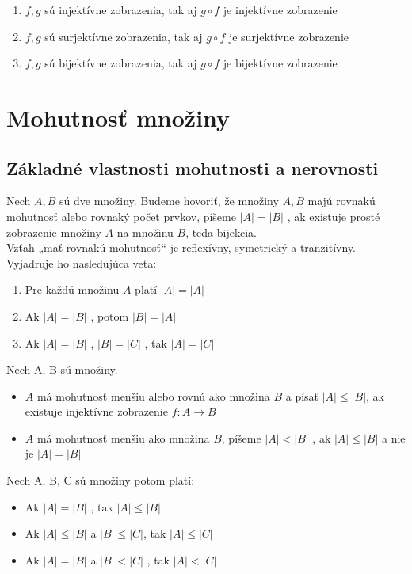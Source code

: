 		\begin{enumerate}
		\item $f , g$ sú injektívne zobrazenia, tak aj $g \circ f$ je injektívne zobrazenie
		\item $f , g$ sú surjektívne zobrazenia, tak aj $g \circ f$ je surjektívne zobrazenie
		\item $f , g$ sú bijektívne zobrazenia, tak aj $g \circ f$ je bijektívne zobrazenie
		\end{enumerate}


\section {Mohutnosť množiny}
	\subsection{Základné vlastnosti mohutnosti a nerovnosti}
		Nech $A, B$ sú dve množiny. Budeme hovoriť, že množiny $A, B$ majú rovnakú mohutnosť alebo rovnaký počet prvkov, píšeme $|A| = |B|$ , ak existuje prosté zobrazenie množiny $A$ na množinu $B$, teda bijekcia.\\

		Vzťah „mať rovnakú mohutnosť“ je reflexívny, symetrický a tranzitívny. Vyjadruje ho nasledujúca veta:
		\begin{enumerate}
			\item Pre každú množinu $A$ platí $|A| = |A|$ 
			\item Ak $|A| = |B|$ , potom $|B| = |A|$
			\item Ak $|A| = |B|$ , $|B| = |C|$ , tak $|A| = |C|$
		\end{enumerate}


	Nech A, B sú množiny.
	\begin{itemize}
		\item $A$ má mohutnosť menšiu alebo rovnú ako množina $B$ a písať $|A| \leq |B|$, ak existuje injektívne zobrazenie $f : A \rightarrow B$
		\item $A$ má mohutnosť menšiu ako množina $B$, píšeme $|A| < |B|$ , ak $|A| \leq |B|$ a nie je $|A| = |B|$
	\end{itemize}

	Nech A, B, C sú množiny potom platí:
	\begin{itemize}
		\item Ak $|A| = |B|$ , tak $|A| \leq |B|$
		\item Ak $|A| \leq |B|$ a $|B| \leq |C|$, tak $|A| \leq |C|$
		\item Ak $|A| = |B|$ a $|B| < |C|$ , tak $|A| < |C|$
	\end{itemize}


